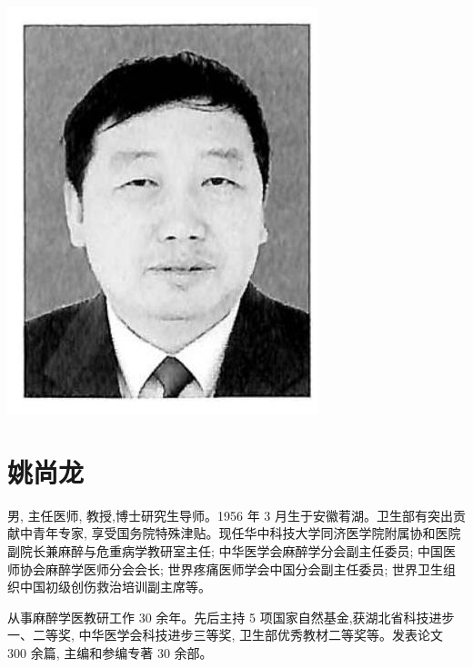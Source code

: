 \documentclass[10pt]{article}
\begin{document}
\begin{center}
\includegraphics[max width=\textwidth]{2024_07_09_002a177993bd97d1d6d7g-014(2)}
\end{center}

\section*{姚尚龙}
男, 主任医师, 教授,博士研究生导师。1956 年 3 月生于安徽䒴湖。卫生部有突出贡献中青年专家, 享受国务院特殊津贴。现任华中科技大学同济医学院附属协和医院副院长兼麻醉与危重病学教研室主任; 中华医学会麻醉学分会副主任委员; 中国医师协会麻醉学医师分会会长; 世界疼痛医师学会中国分会副主任委员; 世界卫生组织中国初级创伤救治培训副主席等。

从事麻醉学医教研工作 30 余年。先后主持 5 项国家自然基金,获湖北省科技进步一、二等奖, 中华医学会科技进步三等奖, 卫生部优秀教材二等奖等。发表论文 300 余篇, 主编和参编专著 30 余部。
\end{document}
